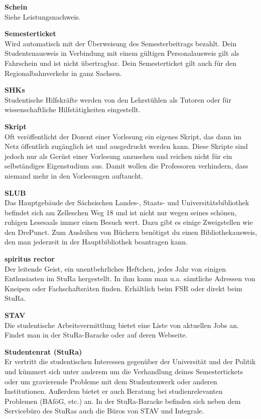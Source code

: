 \textbf{Schein} \\
Siehe Leistungsnachweis.

\textbf{Semesterticket} \\
Wird automatisch mit der Überweisung des Semesterbeitrags bezahlt.
Dein Studentenausweis in Verbindung mit einem gültigen Personalausweis gilt als Fahrschein und ist nicht übertragbar.
Dein Semesterticket gilt auch für den Regionalbahnverkehr in ganz Sachsen.

\textbf{SHKs} \\
Studentische Hilfskräfte werden von den Lehrstühlen als Tutoren oder für wissenschaftliche Hilfstätigkeiten eingestellt.

\textbf{Skript} \\
Oft veröffentlicht der Dozent einer Vorlesung ein eigenes Skript, das dann im Netz öffentlich zugänglich ist und ausgedruckt werden kann.
Diese Skripte sind jedoch nur als Gerüst einer Vorlesung anzusehen und reichen nicht für ein selbständiges Eigenstudium aus.
Damit wollen die Professoren verhindern, dass niemand mehr in den Vorlesungen auftaucht.

\textbf{SLUB} \\
Das Hauptgebäude der Sächsischen Landes-, Staats- und Universitätsbibliothek befindet sich am Zelleschen Weg 18 und ist nicht nur wegen seines schönen, ruhigen Lesesaals immer einen Besuch wert.
Dazu gibt es einige Zweigstellen wie den DrePunct.
Zum Ausleihen von Büchern benötigst du einen Bibliothekausweis, den man jederzeit in der Hauptbibliothek beantragen kann.

\textbf{spiritus rector} \\
Der \glqq leitende Geist\grqq , ein unentbehrliches Heftchen, jedes Jahr von einigen Enthusiasten im StuRa hergestellt.
In ihm kann man u.a. sämtliche Adressen von Kneipen oder Fachschaftsräten finden.
Erhältlich beim FSR oder direkt beim StuRa.

\textbf{STAV} \\
Die studentische Arbeitsvermittlung bietet eine Liste von aktuellen Jobs an.
Findet man in der StuRa-Baracke oder auf deren Webseite.

\textbf{Studentenrat (StuRa)} \\
Er vertritt die studentischen Interessen gegenüber der Universität und der Politik und kümmert sich unter anderem um die Verhandlung deines Semestertickets oder um gravierende Probleme mit dem Studentenwerk oder anderen Institutionen.
Außerdem bietet er auch Beratung bei studienrelevanten Problemen (BAföG, etc.) an.
In der StuRa-Baracke befinden sich neben dem Servicebüro des StuRas auch die Büros von STAV und Integrale.


